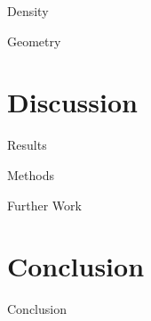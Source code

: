 \documentclass[aspectratio=169,hyperref={pdfpagelabels=false}]{beamer}
\begin{document}
\begin{frame}{Density} %
    
\end{frame}

\begin{frame}{Geometry} %
    
\end{frame}

\section{Discussion} %
\begin{frame}{Results} %
    
\end{frame}

\begin{frame}{Methods} %
    
\end{frame}

\begin{frame}{Further Work} %

\end{frame}

\section{Conclusion} %
\begin{frame}{Conclusion} %
    
\end{frame}
\end{document}
